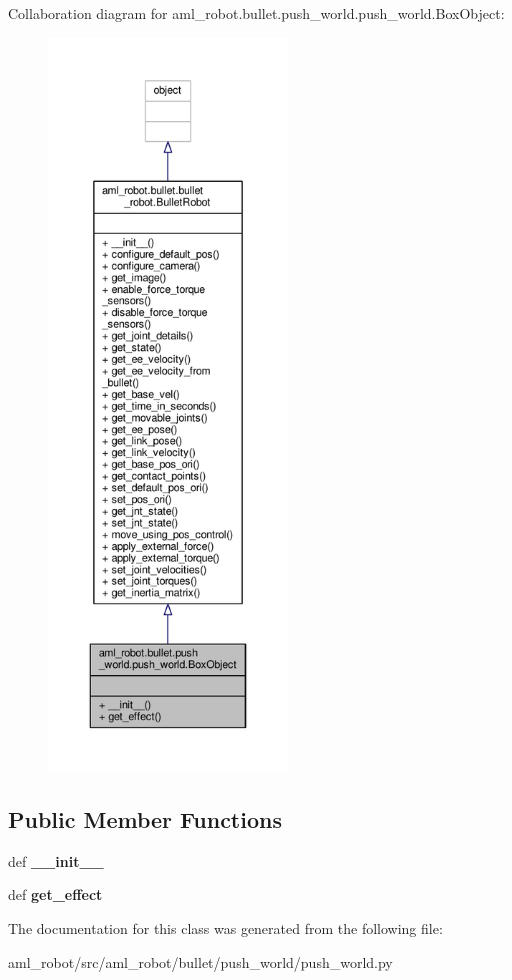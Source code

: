 Collaboration diagram for aml\-\_\-robot.\-bullet.\-push\-\_\-world.\-push\-\_\-world.\-Box\-Object\-:\nopagebreak
\begin{figure}[H]
\begin{center}
\leavevmode
\includegraphics[height=550pt]{classaml__robot_1_1bullet_1_1push__world_1_1push__world_1_1_box_object__coll__graph}
\end{center}
\end{figure}
\subsection*{Public Member Functions}
\begin{DoxyCompactItemize}
\item 
\hypertarget{classaml__robot_1_1bullet_1_1push__world_1_1push__world_1_1_box_object_a56b5453d71cae48208e50ff49a555d7a}{def {\bfseries \-\_\-\-\_\-init\-\_\-\-\_\-}}\label{classaml__robot_1_1bullet_1_1push__world_1_1push__world_1_1_box_object_a56b5453d71cae48208e50ff49a555d7a}

\item 
\hypertarget{classaml__robot_1_1bullet_1_1push__world_1_1push__world_1_1_box_object_a8288813cc6065a361e6507c9540ed268}{def {\bfseries get\-\_\-effect}}\label{classaml__robot_1_1bullet_1_1push__world_1_1push__world_1_1_box_object_a8288813cc6065a361e6507c9540ed268}

\end{DoxyCompactItemize}


The documentation for this class was generated from the following file\-:\begin{DoxyCompactItemize}
\item 
aml\-\_\-robot/src/aml\-\_\-robot/bullet/push\-\_\-world/push\-\_\-world.\-py\end{DoxyCompactItemize}
